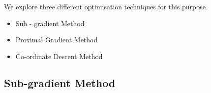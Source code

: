 \documentclass[tikz]{beamer}					%
\begin{document}
{
\begin{frame}
We explore three different optimisation techniques for this purpose.
\begin{itemize}
    \item Sub  - gradient Method
    \item Proximal Gradient Method
    \item Co-ordinate Descent Method
\end{itemize}
\end{frame}
}

\subsection{Sub-gradient Method}
\end{document}
